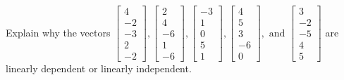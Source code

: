 \documentclass{article}
\begin{document}
\begin{exerciseStatement}
    Explain why the vectors \(\left[\begin{array}{r}
4 \\
-2 \\
-3 \\
2 \\
-2
\end{array}\right] , \left[\begin{array}{r}
2 \\
4 \\
-6 \\
1 \\
-6
\end{array}\right] , \left[\begin{array}{r}
-3 \\
1 \\
0 \\
5 \\
1
\end{array}\right] , \left[\begin{array}{r}
4 \\
5 \\
3 \\
-6 \\
0
\end{array}\right] , \text{ and } \left[\begin{array}{r}
3 \\
-2 \\
-5 \\
4 \\
5
\end{array}\right]\) are linearly dependent or linearly independent.


  
\end{exerciseStatement}
\end{document}
